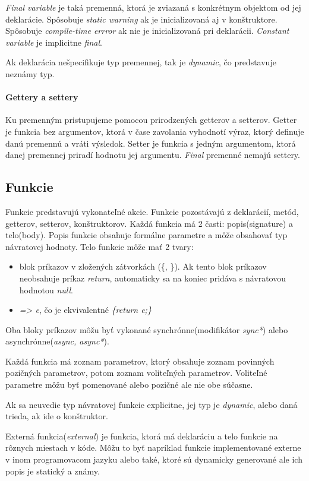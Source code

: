 \emph{Final variable} je taká premenná, ktorá je zviazaná s konkrétnym objektom od jej deklarácie. Spôsobuje \emph{static warning} ak je inicializovaná aj v konštruktore. Spôsobuje \emph{compile-time errror} ak nie je inicializovaná pri deklarácii.
\emph{Constant variable} je implicitne \emph{final}.

Ak deklarácia nešpecifikuje typ premennej, tak je \emph{dynamic}, čo predstavuje neznámy typ.

\paragraph{Gettery a settery}
Ku premenným pristupujeme pomocou prirodzených getterov a setterov. 
Getter je funkcia bez argumentov, ktorá v čase zavolania vyhodnotí výraz, ktorý definuje danú premennú a vráti výsledok.
Setter je funkcia s jedným argumentom, ktorá danej premennej priradí hodnotu jej argumentu. \emph{Final} premenné nemajú settery.

\subsection{Funkcie}
Funkcie predstavujú vykonateľné akcie. Funkcie pozostávajú z deklarácií, metód, getterov, setterov, konštruktorov. %
Každá funkcia má 2 časti: popis(signature) a telo(body). Popis funkcie obsahuje formálne parametre a môže obsahovať typ návratovej hodnoty. Telo funkcie môže mať 2 tvary:
\begin{itemize}
\item blok príkazov v zložených zátvorkách (\{, \}). Ak tento blok príkazov neobsahuje príkaz \emph{return}, automaticky sa na koniec pridáva s návratovou hodnotou \emph{null}.
\item \emph{=> e}, čo je ekvivalentné \emph{\{return e;\}}
\end{itemize}
Oba bloky príkazov môžu byť vykonané synchrónne(modifikátor \emph{sync*}) alebo asynchrónne(\emph{async, async*}).

Každá funkcia má zoznam parametrov, ktorý obsahuje zoznam povinných pozičných parametrov, potom zoznam voliteľných parametrov. Voliteľné parametre môžu byť pomenované alebo pozičné ale nie obe súčasne.

Ak sa neuvedie typ návratovej funkcie explicitne, jej typ je \emph{dynamic}, alebo daná trieda, ak ide o konštruktor.

Externá funkcia(\emph{external}) je funkcia, ktorá má deklaráciu a telo funkcie na rôznych miestach v kóde. Môžu to byť napríklad funkcie implementované externe v inom programovacom jazyku alebo také, ktoré sú dynamicky generované ale ich popis je statický a známy.

